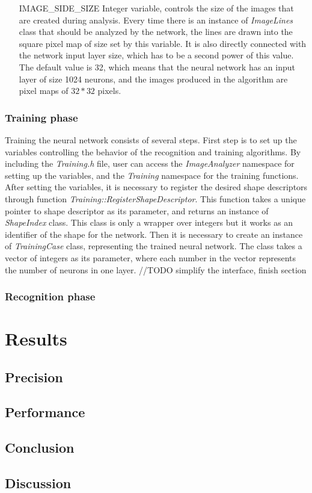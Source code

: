 \begin{enumerate}
\item [IMAGE\_SIDE\_SIZE] Integer variable, controls the size of the images that are created during analysis. Every time there is an instance of \emph{ImageLines} class that should be analyzed by the network, the lines are drawn into the square pixel map of size set by this variable. It is also directly connected with the network input layer size, which has to be a second power of this value. The default value is 32, which means that the neural network has an input layer of size 1024 neurons, and the images produced in the algorithm are pixel maps of $32*32$ pixels.

\end{enumerate}

\subsection{Training phase}
Training the neural network consists of several steps. First step is to set up the variables controlling the behavior of the recognition and training algorithms. By including the \emph{Training.h} file, user can access the \emph{ImageAnalyzer} namespace for setting up the variables, and the \emph{Training} namespace for the training functions. After setting the variables, it is necessary to register the desired shape descriptors through function \emph{Training::RegisterShapeDescriptor}. This function takes a unique pointer to shape descriptor as its parameter, and returns an instance of \emph{ShapeIndex} class. This class is only a wrapper over integers but it works as an identifier of the shape for the network. Then it is necessary to create an instance of \emph{TrainingCase} class, representing the trained neural network. The class takes a vector of integers as its parameter, where each number in the vector represents the number of neurons in one layer. 
//TODO simplify the interface, finish section

\subsection{Recognition phase}


\chapter{Results}

\section{Precision}

\section{Performance}

\section{Conclusion}

\section{Discussion}

